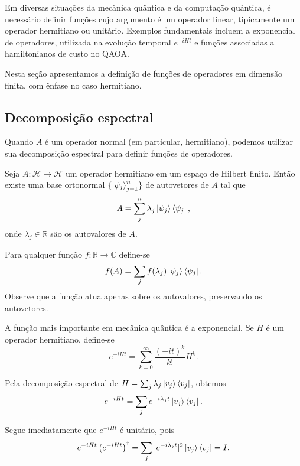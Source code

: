 Em diversas situações da mecânica quântica e da computação quântica, é necessário definir funções cujo argumento é um operador linear, tipicamente um operador hermitiano ou unitário. Exemplos fundamentais incluem a exponencial de operadores, utilizada na evolução temporal $e^{-iHt}$ e funções associadas a hamiltonianos de custo no QAOA.

Nesta seção apresentamos a definição de funções de operadores em dimensão finita, com ênfase no caso hermitiano.

\subsection{Decomposição espectral}

Quando $A$ é um operador normal (em particular, hermitiano), podemos utilizar sua decomposição espectral para definir funções de operadores.

\begin{theorem}
Seja $A:\mathcal{H}\to \mathcal{H}$ um operador hermitiano em um espaço de Hilbert finito. Então existe uma base ortonormal $\{\ket{\psi_j}_{j=1}^n\}$ de autovetores de $A$ tal que
\begin{equation}
    A = \sum_{j}^n \lambda_j \ket{\psi_j}\bra{\psi_j},
\end{equation}
onde $\lambda_j \in \mathbb{R}$ são os autovalores de $A$.
\end{theorem}
Para qualquer função $f : \mathbb{R} \to \mathbb{C}$ define-se
\begin{equation}
    f(A) = \sum_{j} f(\lambda_j)\ket{\psi_j}\bra{\psi_j}.
\end{equation}
Observe que a função atua apenas sobre os autovalores, preservando os autovetores.

\begin{example}\label{ex:opex}
	A função mais importante em mecânica quântica é a exponencial. Se $H$ é um operador hermitiano, define-se
	\begin{equation}
		e^{-iHt} = \sum_{k=0}^{\infty} \frac{(-it)^k}{k!} H^k.
	\end{equation}

	Pela decomposição espectral de $H = \sum_j \lambda_j \ket{v_j}\bra{v_j}$, obtemos
	\begin{equation}
		e^{-iHt}
		=
		\sum_j e^{-i\lambda_j t} \ket{v_j}\bra{v_j}.
	\end{equation}

	Segue imediatamente que $e^{-iHt}$ é unitário, pois
	\begin{equation}
		e^{-iHt} \left(e^{-iHt}\right)^\dagger
		=
		\sum_j |e^{-i\lambda_j t}|^2 \ket{v_j}\bra{v_j}
		=
		I.
	\end{equation}
\end{example}

